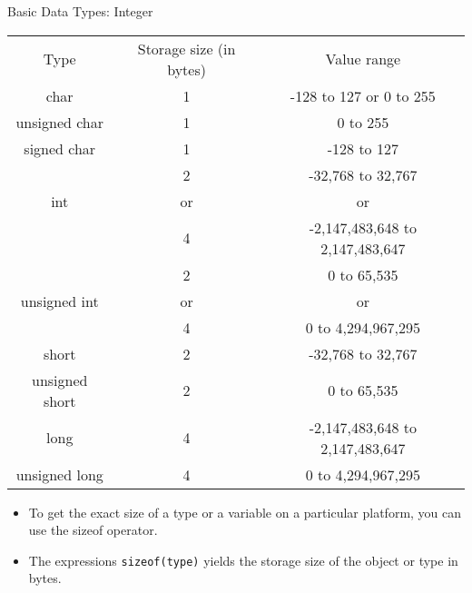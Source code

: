 \documentclass[10pt,t]{beamer}
\begin{document}
\begin{frame}[fragile]{Basic Data Types: Integer}
  \begin{center}
    \begin{tabular}{ccc}
      \rowcolor{lublue}Type & Storage size (in bytes) & Value range \\
      \rowcolor{lulime}char            & 1      & -128 to 127 or 0 to 255 \\
      \rowcolor{lulime}unsigned char   & 1      & 0 to 255 \\
      \rowcolor{lulime}signed char     & 1      & -128 to 127 \\
      \rowcolor{lulime!60}\multirow{3}{*}{int} & 2 & -32,768 to 32,767 \\ \rowcolor{lulime!60}int & or & or \\ \rowcolor{lulime!60}& 4 &  -2,147,483,648 to 2,147,483,647 \\
      \rowcolor{lulime}\multirow{3}{*}{unsigned int} & 2 & 0 to 65,535 \\ \rowcolor{lulime}unsigned int& or & or  \\ \rowcolor{lulime}& 4 & 0 to 4,294,967,295 \\
      \rowcolor{lulime!60}short           & 2      & -32,768 to 32,767 \\
      \rowcolor{lulime!60}unsigned short  & 2      & 0 to 65,535 \\ 
      \rowcolor{lulime}long            & 4      & -2,147,483,648 to 2,147,483,647 \\
      \rowcolor{lulime}unsigned long   & 4      & 0 to 4,294,967,295 \\
    \end{tabular}
  \end{center}
  \begin{itemize}
    \item To get the exact size of a type or a variable on a particular platform, you can use the sizeof operator. 
    \item The expressions \lstinline|sizeof(type)| yields the storage size of the object or type in bytes. 
  \end{itemize}
\end{frame}
\end{document}
